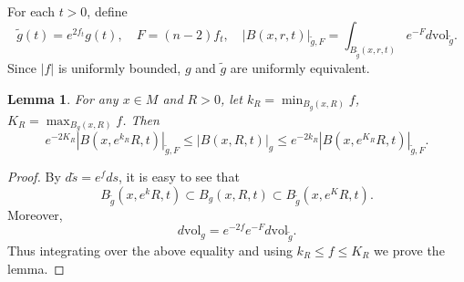 \documentclass[11pt]{amsart}
\numberwithin{equation}{section}
\newtheorem{lemma}[theorem]{Lemma}
\newcommand{\vol}{\mathrm{vol}}
\begin{document}
For each $t>0$, define
\[
\tilde g(t)=e^{2f_t}g(t),
\quad F=(n-2)f_t,\quad |B(x,r,t)|_{\tilde{g},F}=\int_{B_{\tilde{g}}(x,r,t)}e^{-F}d\vol_{\tilde{g}}.
\]
Since $|f|$ is uniformly bounded, $g$ and $\tilde g$ are uniformly equivalent. 
\begin{lemma}\label{ball}
	For any $x\in M$ and $R>0$, let
	$k_R=\min_{B_g(x,R)}f$, $K_R=\max_{B_g(x,R)}f$.
	Then
	\[
	e^{-2K_R}|B(x,e^{k_R}R,t)|_{\tilde{g},F}\leq |B(x,R,t)|_{g}\leq e^{-2k_R}|B(x,e^{K_R}R,t)|_{\tilde{g},F}.
	\]
\end{lemma}
\begin{proof}
	By $d\tilde s=e^f ds$,  it is easy to see that	
	\[
	B_{\tilde{g}}(x,e^{k}R,t)\subset B_{g}(x,R,t)\subset B_{\tilde{g}}(x,e^{K}R,t).
	\]
	Moreover,
	\[
	d\vol_g=e^{-2f}e^{-F}d\vol_{\widetilde g}.
	\]
	Thus integrating over the above equality and using $k_R\le f\le K_R$ we prove the lemma.
\end{proof}
\end{document}
